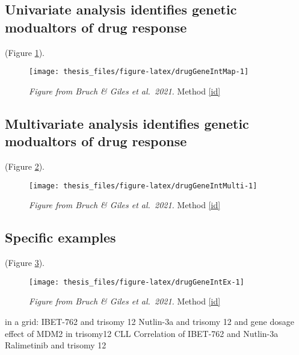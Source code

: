 \documentclass[11pt, a4paper, twosided]{book}
\begin{document}
\hypertarget{univariate-analysis-identifies-genetic-modualtors-of-drug-response}{%
\subsection{Univariate analysis identifies genetic modualtors of drug response}\label{univariate-analysis-identifies-genetic-modualtors-of-drug-response}}

(Figure \ref{fig:drugGeneIntMap}).


\begin{figure}

{\centering \texttt{[image: thesis\_files/figure-latex/drugGeneIntMap-1]} 

}

\caption{\emph{Figure from Bruch \& Giles et al.~2021.} Method \ref{id}}\label{fig:drugGeneIntMap}
\end{figure}
\hypertarget{multivariate-analysis-identifies-genetic-modualtors-of-drug-response}{%
\subsection{Multivariate analysis identifies genetic modualtors of drug response}\label{multivariate-analysis-identifies-genetic-modualtors-of-drug-response}}

(Figure \ref{fig:drugGeneIntMulti}).


\begin{figure}

{\centering \texttt{[image: thesis\_files/figure-latex/drugGeneIntMulti-1]} 

}

\caption{\emph{Figure from Bruch \& Giles et al.~2021.} Method \ref{id}}\label{fig:drugGeneIntMulti}
\end{figure}
\hypertarget{specific-examples}{%
\subsection{Specific examples}\label{specific-examples}}

(Figure \ref{fig:drugGeneIntEx}).


\begin{figure}

{\centering \texttt{[image: thesis\_files/figure-latex/drugGeneIntEx-1]} 

}

\caption{\emph{Figure from Bruch \& Giles et al.~2021.} Method \ref{id}}\label{fig:drugGeneIntEx}
\end{figure}
in a grid:
IBET-762 and trisomy 12
Nutlin-3a and trisomy 12 and gene dosage effect of MDM2 in trisomy12 CLL
Correlation of IBET-762 and Nutlin-3a
Ralimetinib and trisomy 12
\end{document}
